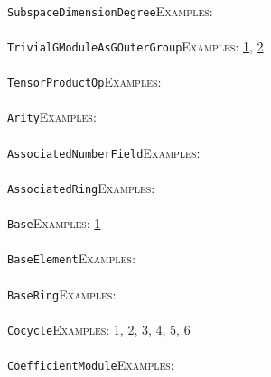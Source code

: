 \documentclass[a4paper,11pt]{report}
\begin{document}
{{ \\
 \texttt{SubspaceDimensionDegree}{\nobreakspace}{\nobreakspace}{\nobreakspace}{\nobreakspace}\textsc{Examples:} \\
 \\
 \texttt{TrivialGModuleAsGOuterGroup}{\nobreakspace}{\nobreakspace}{\nobreakspace}{\nobreakspace}\textsc{Examples:} \href{../www/SideLinks/About/aboutCoefficientSequence.html} {1}{\nobreakspace}, \href{../www/SideLinks/About/aboutGouter.html} {2}{\nobreakspace} \\
 \\
 \texttt{TensorProductOp}{\nobreakspace}{\nobreakspace}{\nobreakspace}{\nobreakspace}\textsc{Examples:} \\
 \\
 \texttt{Arity}{\nobreakspace}{\nobreakspace}{\nobreakspace}{\nobreakspace}\textsc{Examples:} \\
 \\
 \texttt{AssociatedNumberField}{\nobreakspace}{\nobreakspace}{\nobreakspace}{\nobreakspace}\textsc{Examples:} \\
 \\
 \texttt{AssociatedRing}{\nobreakspace}{\nobreakspace}{\nobreakspace}{\nobreakspace}\textsc{Examples:} \\
 \\
 \texttt{Base}{\nobreakspace}{\nobreakspace}{\nobreakspace}{\nobreakspace}\textsc{Examples:} \href{../www/SideLinks/About/aboutKnots.html} {1}{\nobreakspace} \\
 \\
 \texttt{BaseElement}{\nobreakspace}{\nobreakspace}{\nobreakspace}{\nobreakspace}\textsc{Examples:} \\
 \\
 \texttt{BaseRing}{\nobreakspace}{\nobreakspace}{\nobreakspace}{\nobreakspace}\textsc{Examples:} \\
 \\
 \texttt{Cocycle}{\nobreakspace}{\nobreakspace}{\nobreakspace}{\nobreakspace}\textsc{Examples:} \href{../www/SideLinks/About/aboutCocycles.html} {1}{\nobreakspace}, \href{../www/SideLinks/About/aboutPolytopes.html} {2}{\nobreakspace}, \href{../www/SideLinks/About/aboutCrossedMods} {3}{\nobreakspace}, \href{../www/SideLinks/About/aboutCrossedMods.html} {4}{\nobreakspace}, \href{../www/SideLinks/About/aboutRosenbergerMonster.html} {5}{\nobreakspace}, \href{../www/SideLinks/About/aboutGouter.html} {6}{\nobreakspace} \\
 \\
 \texttt{CoefficientModule}{\nobreakspace}{\nobreakspace}{\nobreakspace}{\nobreakspace}\textsc{Examples:} \\
}}
\end{document}
